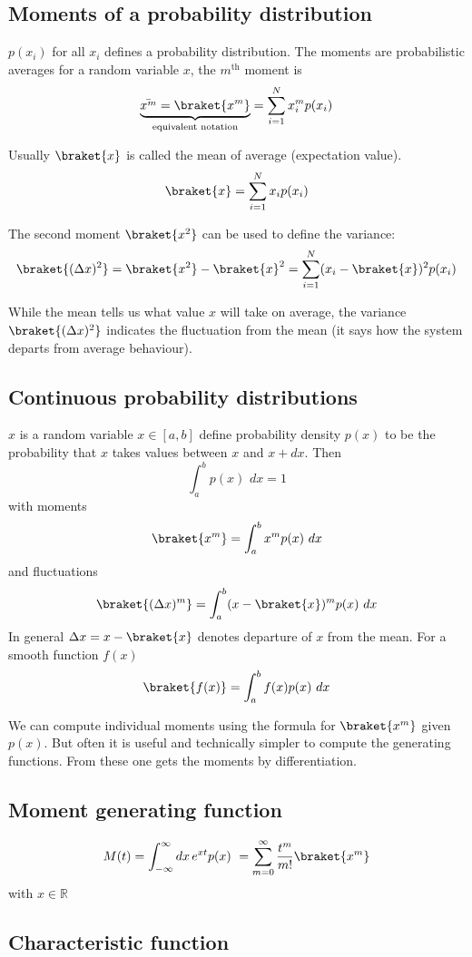 \subsection{Moments of a probability distribution}

$p(x_i)$ for all $x_i$ defines a probability distribution. The moments are probabilistic averages for a random variable $x$, the $m^{\text{th}}$ moment is $$\underbrace{\bar{x^m} = \braket{x^m}}_{\text{equivalent notation}} = \sum_{i=1}^N x_i^m p(x_i)$$

Usually $\braket{x}$ is called the mean of average (expectation value). $$\braket{x} = \sum_{i=1}^N x_i p(x_i)$$

The second moment $\braket{x^2}$ can be used to define the variance: $$\braket{(\Delta x)^2} = \braket{x^2} - \braket{x}^2 = \sum_{i=1}^N (x_i - \braket{x})^2 p(x_i)$$

While the mean tells us what value $x$ will take on average, the variance $\braket{(\Delta x)^2}$ indicates the fluctuation from the mean (it says how the system departs from average behaviour).

\subsection{Continuous probability distributions}

$x$ is a random variable $x \in [a,b]$ define probability density $p(x)$ to be the probability that $x$ takes values between $x$ and $x+dx$. Then $$\int_a^b p(x) \, \, dx = 1$$ with moments $$\braket{x^m} = \int_a^b x^m p(x) \, \, dx$$ and fluctuations $$\braket{(\Delta x)^m} = \int_a^b (x - \braket{x})^m p(x) \, \, dx$$
In general $\Delta x = x - \braket{x}$ denotes departure of $x$ from the mean. For a smooth function $f(x)$ 
$$\braket{f(x)} = \int_a^b f(x) p(x) \, \, dx$$

We can compute individual moments using the formula for $\braket{x^m}$ given $p(x)$. But often it is useful and technically simpler to compute the generating functions. From these one gets the moments by differentiation.

\subsection{Moment generating function}

\[M(t) = \int_{-\infty}^{\infty} dx \, e^{xt} p(x)\ = \sum_{m=0}^{\infty} \frac{t^m}{m!} \braket{x^m}\] with $x\in \mathbb{R}$

\subsection{Characteristic function}

